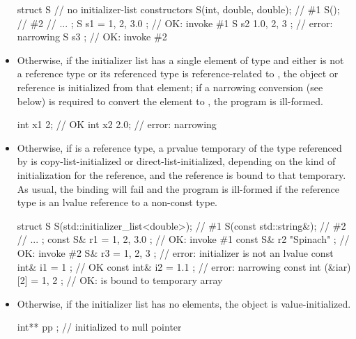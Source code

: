 \begin{itemize}
\enterexample
\begin{codeblock}
struct S {
  // no initializer-list constructors
  S(int, double, double);           // \#1
  S();                              // \#2
  // ...
};
S s1 = { 1, 2, 3.0 };               // OK: invoke \#1
S s2 { 1.0, 2, 3 };                 // error: narrowing
S s3 { };                           // OK: invoke \#2
\end{codeblock}
\exitexample

\item Otherwise, if
the initializer list has a single element of type  and either
 is not a reference type or its referenced type is
reference-related to , the object or reference is initialized
from that element; if a narrowing conversion (see below) is required
to convert the element to , the program is ill-formed.

\enterexample
\begin{codeblock}
int x1 {2};                         // OK
int x2 {2.0};                       // error: narrowing
\end{codeblock}
\exitexample

\item Otherwise, if  is a reference type, a prvalue temporary of the type
referenced by  is copy-list-initialized or direct-list-initialized,
depending on the kind of initialization for the reference, and the reference is
bound to that temporary.
\enternote As usual, the binding will fail and the program is ill-formed if
the reference type is an lvalue reference to a non-const type. \exitnote

\enterexample
\begin{codeblock}
struct S {
  S(std::initializer_list<double>); // \#1
  S(const std::string&);            // \#2
  // ...
};
const S& r1 = { 1, 2, 3.0 };        // OK: invoke \#1
const S& r2 { "Spinach" };          // OK: invoke \#2
S& r3 = { 1, 2, 3 };                // error: initializer is not an lvalue
const int& i1 = { 1 };              // OK
const int& i2 = { 1.1 };            // error: narrowing
const int (&iar)[2] = { 1, 2 };     // OK:  is bound to temporary array
\end{codeblock}
\exitexample

\item Otherwise, if the initializer list has no elements, the object is
value-initialized.

\enterexample
\begin{codeblock}
int** pp {};                        // initialized to null pointer
\end{codeblock}
\exitexample


\end{itemize}

